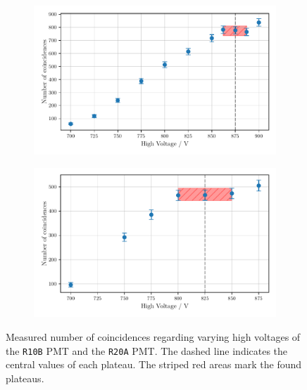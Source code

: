 \begin{figure}
        \centering
        \begin{subfigure}[b]{0.48\textwidth}
        \includegraphics[width=\textwidth]{plots/hvR20A.pdf}
        \label{fig:hvPMT1}
    \end{subfigure}\hfill
\begin{subfigure}[b]{0.48\textwidth}
        \includegraphics[width=\textwidth]{plots/hvR10B.pdf}
        \label{fig:hvPMT2}
\end{subfigure}
\caption{Measured number of coincidences regarding varying high voltages
of the \texttt{R10B} PMT and the \texttt{R20A} PMT.
The dashed line indicates the central values of each plateau. The striped red areas mark the found plateaus.}
\label{fig:hv}
\end{figure}


